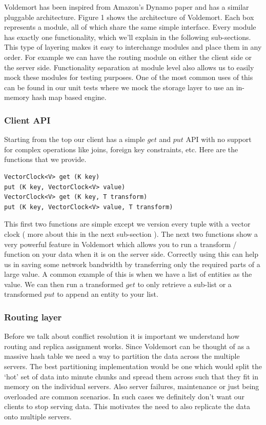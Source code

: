 \documentclass[10pt,twocolumn,preprint,natbib,authoryear]{sigplanconf}
\begin{document}
Voldemort has been inspired from Amazon's Dynamo paper and has a similar pluggable architecture. Figure 1 shows the architecture of Voldemort. Each box represents a module, all of which share the same simple interface. Every module has exactly one functionality, which we'll explain in the following sub-sections. This type of layering makes it easy to interchange modules and place them in any order. For example we can have the routing module on either the client side or the server side. Functionality separation at module level also allows us to easily mock these modules for testing purposes. One of the most common uses of this can be found in our unit tests where we mock the storage layer to use an in-memory hash map based engine. 

\subsubsection {Client API }  
Starting from the top our client has a simple $get$ and $put$ API with no support for complex operations like joins, foreign key constraints, etc. Here are the functions that we provide. 
\begin{verbatim}
VectorClock<V> get (K key)
put (K key, VectorClock<V> value)
VectorClock<V> get (K key, T transform)
put (K key, VectorClock<V> value, T transform)
\end{verbatim}

This first two functions are simple except we version every tuple with a vector clock ( more about this in the next sub-section ). The next two functions show a very powerful feature in Voldemort which allows you to run a transform / function on your data when it is on the server side. Correctly using this can help us in saving some network bandwidth by transferring only the required parts of a large value. A common example of this is when we have a list of entities as the value. We can then run a transformed $get$ to only retrieve a sub-list or a transformed $put$ to append an entity to your list. 

\subsubsection {Routing layer }  
Before we talk about conflict resolution it is important we understand how routing and replica assignment works. Since Voldemort can be thought of as a massive hash table we need a way to partition the data across the multiple servers. The best partitioning implementation would be one which would split the `hot' set of data into minute chunks and spread them across such that they fit in memory on the individual servers. Also server failures, maintenance or just being overloaded are common scenarios. In such cases we definitely don't want our clients to stop serving data. This motivates the need to also replicate the data onto multiple servers. 
\end{document}
